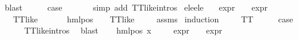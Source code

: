 \begin{isabellebody}
\ blast\isanewline
\ \ \isamarkupfalse%
\ \isamarkupfalse%
\ {\isacharquery}{\kern0pt}case\ \isanewline
\ \ \ \ \isamarkupfalse%
\ {\isacharparenleft}{\kern0pt}simp\ add{\isacharcolon}{\kern0pt}\ TT{\isacharunderscore}{\kern0pt}like{\isachardot}{\kern0pt}intros{\isacharparenleft}{\kern0pt}{}{\isacharparenright}{\kern0pt}{\isacharparenright}{\kern0pt}\isanewline
{}\isamarkupfalse%
%
\endisatagproof
{\isafoldproof}%
%
\isadelimproof
\isanewline
%
\endisadelimproof
\isanewline
{}\isamarkupfalse%
\ e{}{\isacharunderscore}{\kern0pt}le{\isacharunderscore}{\kern0pt}{}{\isacharunderscore}{\kern0pt}e{}{\isacharunderscore}{\kern0pt}le{\isacharunderscore}{\kern0pt}{}{\isacharcolon}{\kern0pt}\isanewline
\ \ \ {\isachardoublequoteopen}expr{\isacharunderscore}{\kern0pt}{}\ {\isasymphi}\ {\isasymle}\ {}{\isachardoublequoteclose}\ {\isachardoublequoteopen}expr{\isacharunderscore}{\kern0pt}{}\ {\isasymphi}\ {\isasymle}\ {}{\isachardoublequoteclose}\isanewline
\ \ \ {\isachardoublequoteopen}TT{\isacharunderscore}{\kern0pt}like\ {\isasymphi}\ {\isasymor}\ {\isacharparenleft}{\kern0pt}{\isasymexists}{\isasymalpha}\ {\isasympsi}{\isachardot}{\kern0pt}\ {\isasymphi}\ {\isacharequal}{\kern0pt}\ {\isacharparenleft}{\kern0pt}hml{\isacharunderscore}{\kern0pt}pos\ {\isasymalpha}\ {\isasympsi}{\isacharparenright}{\kern0pt}\ {\isasymand}\ TT{\isacharunderscore}{\kern0pt}like\ {\isasympsi}{\isacharparenright}{\kern0pt}{\isachardoublequoteclose}\isanewline
%
\isadelimproof
\ \ %
\endisadelimproof
%
\isatagproof
{}\isamarkupfalse%
\ assms\ \isamarkupfalse%
{\isacharparenleft}{\kern0pt}induction\ {\isasymphi}{\isacharparenright}{\kern0pt}\isanewline
\ \ \isamarkupfalse%
\ TT\isanewline
\ \ \isamarkupfalse%
\ \isamarkupfalse%
\ {\isacharquery}{\kern0pt}case\ \isanewline
\ \ \ \ \isamarkupfalse%
\ TT{\isacharunderscore}{\kern0pt}like{\isachardot}{\kern0pt}intros{\isacharparenleft}{\kern0pt}{}{\isacharparenright}{\kern0pt}\ \isamarkupfalse%
\ blast\isanewline
{}\isamarkupfalse%
\isanewline
\ \ \isamarkupfalse%
\ {\isacharparenleft}{\kern0pt}hml{\isacharunderscore}{\kern0pt}pos\ x{}\ {\isasymphi}{\isacharparenright}{\kern0pt}\isanewline
\ \ \isamarkupfalse%
\ {\isachardoublequoteopen}expr{\isacharunderscore}{\kern0pt}{}\ {\isasymphi}\ {\isasymle}\ {}{\isachardoublequoteclose}\ {\isachardoublequoteopen}expr{\isacharunderscore}{\kern0pt}{}\ {\isasymphi}\ {\isasymle}\ {}{\isachardoublequoteclose}\isanewline

\end{isabellebody}
